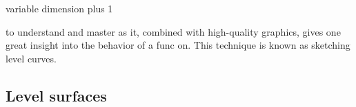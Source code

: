 \documentclass{ximera}
\begin{document}
variable dimension plus 1

to understand and master as it, combined with high-quality graphics,
gives one great insight into the behavior of a func on. This technique
is known as sketching level curves.









\subsection{Level surfaces}
\end{document}
